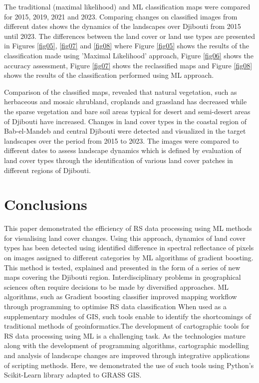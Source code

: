 \documentclass[jimaging,article,submit,pdftex,moreauthors]{Definitions/mdpi}
\begin{document}
{The} traditional (maximal likelihood) and ML{ }classification maps {were} compared {for} 2015, 2019, 2021 and 2023. Comparing changes on classified images from different dates shows the dynamics of the landscapes over Djibouti from 2015 until 2023. The{ }differences between the{ }land cover or land use types are presented in Figures \ref{fig05}, \ref{fig07} and \ref{fig08} where Figure \ref{fig05} shows the results of the classification made using 'Maximal Likelihood' approach, Figure \ref{fig06} shows the accuracy assessment, Figure \ref{fig07} shows the reclassified maps and Figure \ref{fig08} shows the results of the classification performed using ML approach. 

Comparison of the classified maps, revealed that{ }natural vegetation, such as herbaceous{ }and mosaic shrubland, croplands and grassland has decreased while the sparse vegetation and bare soil areas typical for desert and semi-desert areas of Djibouti have increased. {Changes} in land cover types in the coastal region of Bab-el-Mandeb and central Djibouti were detected and visualized in the target landscapes over the period from 2015 to 2023. {The} images were compared to different dates to assess landscape dynamics which is defined by evaluation of land cover types through the identification of various land cover patches in different regions of Djibouti.

\section{Conclusions}

This paper {demonstrated the efficiency of RS data processing using ML methods for visualising} land cover changes. Using this approach, dynamics of land cover types {has been} detected using{ identified difference in} spectral reflectance of pixels {on} images assigned to different categories by ML algorithms of gradient boosting. This method is tested, explained and presented in the form of a series of new maps covering the Djibouti region. Interdisciplinary problems in geographical sciences{ }often require decisions to be made by diversified approaches{.} ML algorithms, such as Gradient boosting classifier {improved} mapping workflow {through} programming{ to optimise RS}  data {classification} When used as a supplementary modules of GIS, such tools enable to identify the{ }shortcomings of traditional methods of geoinformatics{.}The development of cartographic tools {for RS data processing }using ML {is} a challenging task{.} As the technologies mature along with the development of programming algorithms, cartographic modelling and analysis of landscape changes are{ }improved{ through }integrative {applications of scripting methods}. Here, we demonstrated {the use of such} tools using Python's Scikit-Learn library {adapted} to{ }GRASS GIS. 
\end{document}
